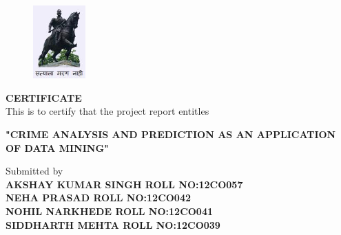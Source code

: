
%
\noindent
\begin{figure}
  \begin{flushleft}
    \includegraphics[width=2cm]{logo.png}
  \end{flushleft}
  \end{figure}
 
	
%
\begin {center}
{\LARGE\bf CERTIFICATE}\\\vspace{1.4cm}
\large {This is to certify that the project report entitles}\\\vspace{0.7cm}

{\bf "CRIME ANALYSIS AND PREDICTION AS AN APPLICATION OF DATA MINING"}\\\vspace{0.7cm}

\large {Submitted by}\\\vspace{0.5cm}
{\small\bf{AKSHAY KUMAR SINGH} \hspace{19mm} {\small ROLL NO:12CO057 }\\{NEHA PRASAD} \hspace{36.5mm} {\small ROLL NO:12CO042 } \\{NOHIL NARKHEDE} \hspace{29mm} {\small ROLL NO:12CO041 } \\{SIDDHARTH MEHTA} \hspace{26.8mm} {\small ROLL NO:12CO039 }\\\vspace{1cm}}
\end{center}
\vspace{5mm} 




